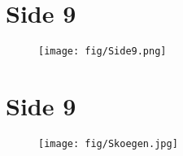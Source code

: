\clearpage
\section*{Side 9}

\begin{figure}[H]
\centering
\texttt{[image: fig/Side9.png]}
\end{figure}

\clearpage
\section*{Side 9}
\begin{figure}[H]
\centering
\texttt{[image: fig/Skoegen.jpg]}
\end{figure}

\clearpage
